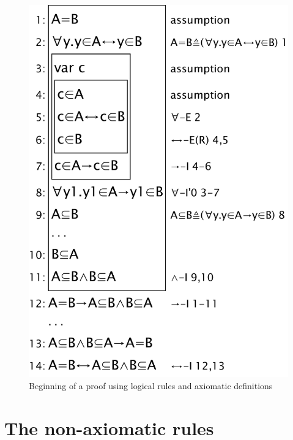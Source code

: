 \begin{figure}
\centering
\includegraphics[scale=0.5]{pics/sets/axiomaticwasteful}
\caption{Beginning of a proof using logical rules and axiomatic definitions}
\label{fig:sets:axiomaticwasteful}
\end{figure}

\section{The non-axiomatic rules}

